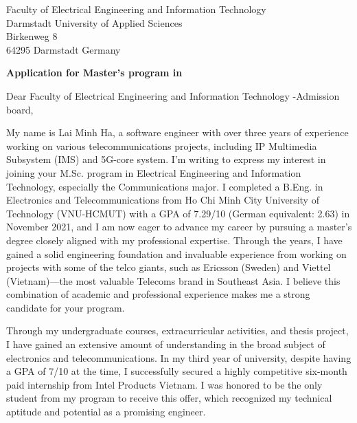 \documentclass[a4paper,11pt]{letter}
\date{}
\begin{document}
\begin{letter}{
    Faculty of Electrical Engineering and Information Technology
    \\ Darmstadt University of Applied Sciences
    \\ Birkenweg 8
    \\ 64295 Darmstadt Germany
}

\vspace*{-1.5cm}
\begin{center}
    \LARGE \textbf{Application for Master's program in }
\end{center}


\opening{Dear Faculty of Electrical Engineering and Information Technology -Admission board,}

My name is Lai Minh Ha, a software engineer with over three years of experience working on various telecommunications projects, including IP Multimedia Subsystem (IMS) and 5G-core system. I'm writing to express my interest in joining your M.Sc. program in Electrical Engineering and Information Technology, especially the Communications major. I completed a B.Eng. in Electronics and Telecommunications from Ho Chi Minh City University of Technology (VNU-HCMUT) with a GPA of 7.29/10 (German equivalent: 2.63) in November 2021, and I am now eager to advance my career by pursuing a master’s degree closely aligned with my professional expertise. Through the years, I have gained a solid engineering foundation and invaluable experience from working on projects with some of the telco giants, such as Ericsson (Sweden) and Viettel (Vietnam)—the most valuable Telecoms brand in Southeast Asia. I believe this combination of academic and professional experience makes me a strong candidate for your program.

Through my undergraduate courses, extracurricular activities, and thesis project, I have gained an extensive amount of understanding in the broad subject of electronics and telecommunications. In my third year of university, despite having a GPA of 7/10 at the time, I successfully secured a highly competitive six-month paid internship from Intel Products Vietnam. I was honored to be the only student from my program to receive this offer, which recognized my technical aptitude and potential as a promising engineer. 


\end{letter}
\end{document}
